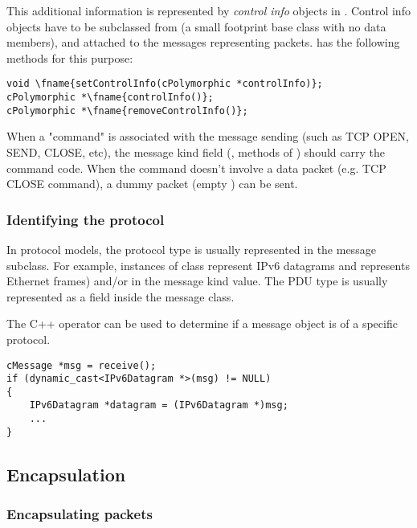 This additional information is represented by \textit{control info}
objects in {\opp}. Control info objects have to be subclassed from
 (a small footprint base class with
no data members), and attached to the messages representing
packets.  has the following methods for this
purpose:

\begin{Verbatim}[commandchars=\\\{\}]
void \fname{setControlInfo(cPolymorphic *controlInfo)};
cPolymorphic *\fname{controlInfo()};
cPolymorphic *\fname{removeControlInfo()};
\end{Verbatim}

When a "command" is associated with the message sending (such as
TCP OPEN, SEND, CLOSE, etc), the message kind field (,
 methods of ) should carry the command code.
When the command doesn't involve a data packet (e.g.
TCP CLOSE command), a dummy packet (empty ) can be sent.



\subsubsection{Identifying the protocol}

In {\opp} protocol models, the protocol type is usually represented
in the message subclass. For example, instances of class
 represent IPv6 datagrams and 
represents Ethernet frames) and/or in the message kind value.
The PDU type is usually represented as a field inside the message class.

The C++  operator can be used to determine
if a message object is of a specific protocol.

\begin{verbatim}
cMessage *msg = receive();
if (dynamic_cast<IPv6Datagram *>(msg) != NULL)
{
    IPv6Datagram *datagram = (IPv6Datagram *)msg;
    ...
}
\end{verbatim}


\subsection{Encapsulation}

\subsubsection{Encapsulating packets}


